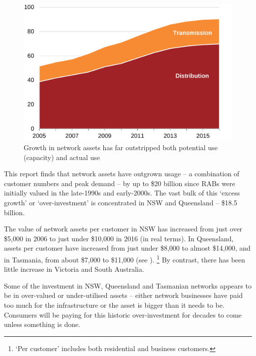 \documentclass[FrontPage]{grattan}
\begin{document}
\begin{figure}
\caption{Growth in network assets has far outstripped both potential use (capacity) and actual use}\label{fig:growth-in-network-assets-beats-usage}
\includegraphics[page=2]{atlas/Charts.pdf}
\end{figure}

This report finds that network assets have outgrown usage -- a combination of customer numbers and peak demand -- by up to \$20 billion since RABs were initially valued in the late-1990s and early-2000s. The vast bulk of this `excess growth' or `over-investment' is concentrated in NSW and Queensland -- \$18.5 billion. 

The value of network assets per customer in NSW has increased from just over \$5,000 in 2006 to just under \$10,000 in 2016 (in real terms). In Queensland, assets per customer have increased from just under \$8,000 to almost \$14,000, and in Tasmania, from about \$7,000 to \$11,000 (see ).%
\footnote{`Per customer' includes both residential and business customers.}
By contrast, there has been little increase in Victoria and South Australia.

Some of the investment in NSW, Queensland and Tasmanian networks appears to be in over-valued or under-utilised assets -- either network businesses have paid too much for the infrastructure or the asset is bigger than it needs to be. Consumers will be paying for this historic over-investment for decades to come unless something is done.
\end{document}
